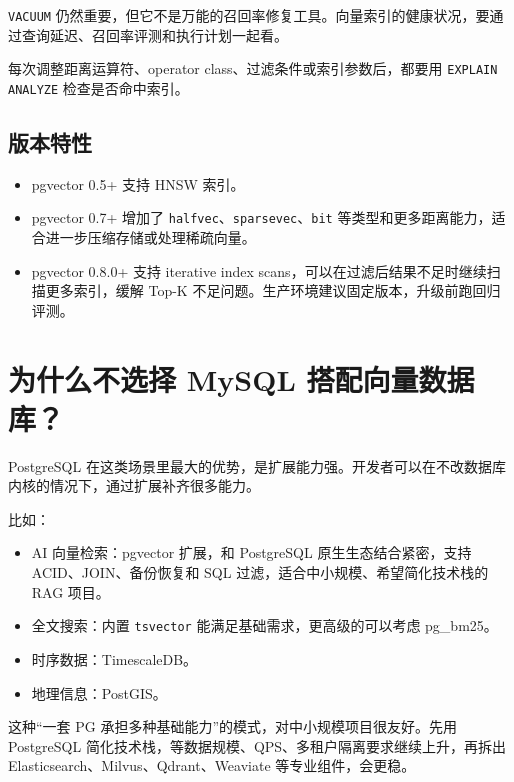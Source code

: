 \documentclass[9pt,a4paper,twocolumn]{ctexart}
\begin{document}
\texttt{VACUUM} 仍然重要，但它不是万能的召回率修复工具。向量索引的健康状况，要通过查询延迟、召回率评测和执行计划一起看。



每次调整距离运算符、operator class、过滤条件或索引参数后，都要用 \texttt{EXPLAIN ANALYZE} 检查是否命中索引。



\subsection*{版本特性}

\begin{itemize}[itemsep=1pt, topsep=2pt]
  \item pgvector 0.5+ 支持 HNSW 索引。
  \item pgvector 0.7+ 增加了 \texttt{halfvec}、\texttt{sparsevec}、\texttt{bit} 等类型和更多距离能力，适合进一步压缩存储或处理稀疏向量。
  \item pgvector 0.8.0+ 支持 iterative index scans，可以在过滤后结果不足时继续扫描更多索引，缓解 Top-K 不足问题。生产环境建议固定版本，升级前跑回归评测。
\end{itemize}


\section*{为什么不选择 MySQL 搭配向量数据库？}


PostgreSQL 在这类场景里最大的优势，是扩展能力强。开发者可以在不改数据库内核的情况下，通过扩展补齐很多能力。



比如：


\begin{itemize}[itemsep=1pt, topsep=2pt]
  \item AI 向量检索：pgvector 扩展，和 PostgreSQL 原生生态结合紧密，支持 ACID、JOIN、备份恢复和 SQL 过滤，适合中小规模、希望简化技术栈的 RAG 项目。
  \item 全文搜索：内置 \texttt{tsvector} 能满足基础需求，更高级的可以考虑 pg\_bm25。
  \item 时序数据：TimescaleDB。
  \item 地理信息：PostGIS。
\end{itemize}


这种“一套 PG 承担多种基础能力”的模式，对中小规模项目很友好。先用 PostgreSQL 简化技术栈，等数据规模、QPS、多租户隔离要求继续上升，再拆出 Elasticsearch、Milvus、Qdrant、Weaviate 等专业组件，会更稳。
\end{document}
